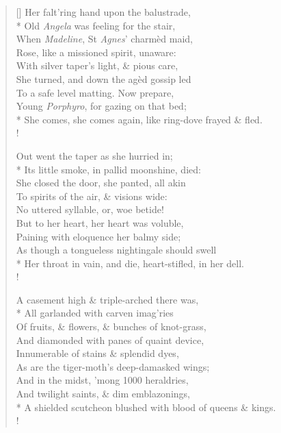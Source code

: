 \documentclass[MAIN]{subfiles}
\begin{document}
\begin{verse}[\versewidth]
\vin Her falt'ring hand upon the balustrade,\\*
\vin Old \emph{Angela} was feeling for the stair,\\
\vin When \emph{Madeline}, St \emph{Agnes}' charm\`ed maid,\\
\vin Rose, like a missioned spirit, unaware:\\
\vin With silver taper's light, \& pious care,\\
\vin She turned, and down the ag\`ed gossip led\\
\vin To a safe level matting. Now prepare,\\
\vin Young \emph{Porphyro}, for gazing on that bed;\\*
She comes, she comes again, like ring-dove frayed \& fled.\\!

\vin Out went the taper as she hurried in;\\*
\vin Its little smoke, in pallid moonshine, died:\\
\vin She closed the door, she panted, all akin\\
\vin To spirits of the air, \& visions wide:\\
\vin No uttered syllable, or, woe betide!\\
\vin But to her heart, her heart was voluble,\\
\vin Paining with eloquence her balmy side;\\
\vin As though a tongueless nightingale should swell\\*
Her throat in vain, and die, heart-stifled, in her dell.\\!

\vin A casement high \& triple-arched there was,\\*
\vin All garlanded with carven imag'ries\\
\vin Of fruits, \& flowers, \& bunches of knot-grass,\\
\vin And diamonded with panes of quaint device,\\
\vin Innumerable of stains \& splendid dyes,\\
\vin As are the tiger-moth's deep-damasked wings;\\
\vin And in the midst, 'mong 1000 heraldries,\\
\vin And twilight saints, \& dim emblazonings,\\*
A shielded scutcheon blushed with blood of queens \& kings.\\!


\end{verse}
\end{document}
